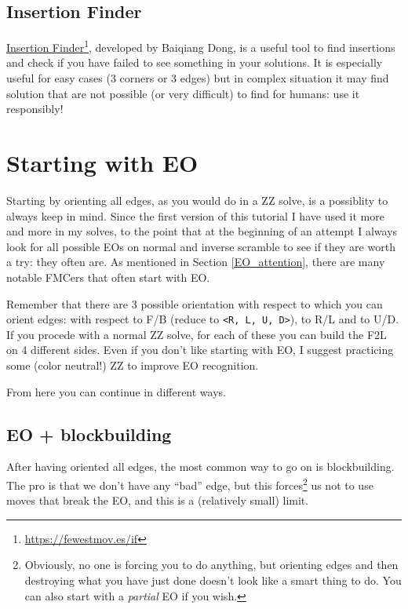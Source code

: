 \documentclass[11pt,a4paper]{book}
\newcommand{\m}{\texttt}
\begin{document}
\subsection{Insertion Finder}

\href{https://fewestmov.es/if}{Insertion Finder}\footnote{\url{https://fewestmov.es/if}}, developed by Baiqiang Dong, is a useful tool to find insertions and check if you have failed to see something in your solutions. %
It is especially useful for easy cases (3 corners or 3 edges) but in complex situation it may find solution that are not possible (or very difficult) to find for humans: use it responsibly!

\section{Starting with EO}
\label{eo}

Starting by orienting all edges, as you would do in a ZZ solve, is a possiblity to always keep in mind. Since the first version of this tutorial I have used it more and more in my solves, to the point that at the beginning of an attempt I always look for all possible EOs on normal and inverse scramble to see if they are worth a try: they often are. As mentioned in Section \ref{EO_attention}, there are many notable FMCers that often start with EO.

Remember that there are 3 possible orientation with respect to which you can orient edges: with respect to F/B (reduce to \m{<R, L, U, D>}), to R/L and to U/D. If you procede with a normal ZZ solve, for each of these you can build the F2L on 4 different sides. Even if you don't like starting with EO, I suggest practicing some (color neutral!) ZZ to improve EO recognition.

From here you can continue in different ways.

\subsection{EO + blockbuilding} 

After having oriented all edges, the most common way to go on is blockbuilding. The pro is that we don't have any ``bad'' edge, but this forces\footnote{Obviously, no one is forcing you to do anything, but orienting edges and then destroying what you have just done doesn't look like a smart thing to do. You can also start with a \emph{partial} EO if you wish.} us not to use moves that break the EO, and this is a (relatively small) limit.
\end{document}
